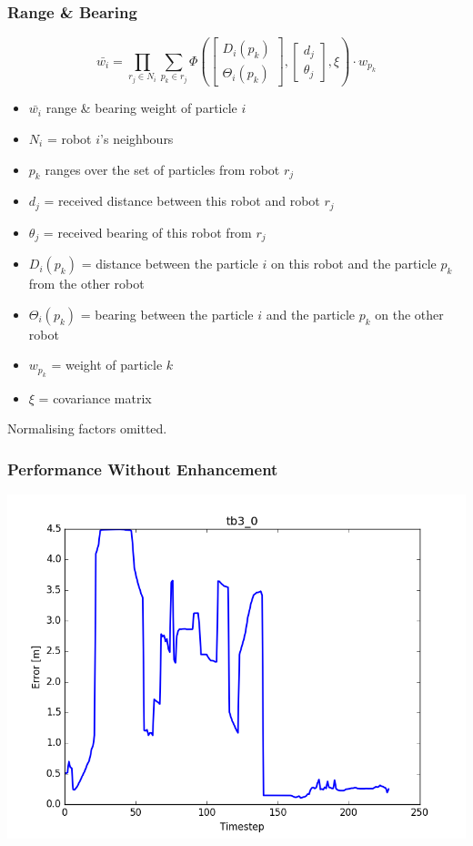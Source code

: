\documentclass{beamer}
\begin{document}
	\begin{frame}
		\frametitle{Range \& Bearing}
		\[
		\bar{w_i} = \prod_{r_j \in N_i}\sum_{p_k \in r_j}\Phi\left(
		\begin{bmatrix}
		D_i(p_k)\\
		\Theta_i(p_k)
		\end{bmatrix},
		\begin{bmatrix}
		d_j\\
		\theta_j
		\end{bmatrix},
		\xi
		\right) \cdot w_{p_k}
		\]
		\begin{itemize}
			\item $\bar{w_i}$ range \& bearing weight of particle $i$
			\item $N_i$ = robot $i$'s neighbours
			\item $p_k$ ranges over the set of particles from robot $r_j$ \item $d_j$ = received distance between this robot and robot $r_j$
			\item $\theta_j$ = received bearing of this robot from $r_j$
			\item $D_i(p_k)$  = distance between the particle $i$ on this robot and the particle $p_k$ from the other robot
			\item $\Theta_i(p_k)$ = bearing between the particle $i$ and the particle $p_k$ on the other robot
			\item $w_{p_k}$ = weight of particle $k$
			\item $\xi$ = covariance matrix
		\end{itemize}
		Normalising factors omitted.
	\end{frame}	
	\begin{frame}
		\frametitle{Performance Without Enhancement}
		\includegraphics[width=\columnwidth]{figure_l2.png}
	\end{frame}
\end{document}
